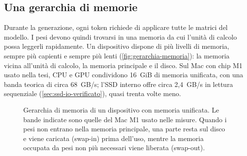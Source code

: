 \subsection{Una gerarchia di memorie}

Durante la generazione, ogni token richiede di applicare tutte le matrici del modello. I pesi devono quindi trovarsi in una memoria da cui l'unità di calcolo possa leggerli rapidamente. Un dispositivo dispone di più livelli di memoria, sempre più capienti e sempre più lenti (\autoref{fig:gerarchia-memoria}): la memoria vicina all'unità di calcolo, la memoria principale e il disco. Sul Mac con chip M1 usato nella tesi, CPU e GPU condividono 16~GiB di memoria unificata, con una banda teorica di circa 68~GB/s; l'SSD interno offre circa 2,4~GB/s in lettura sequenziale (\autoref{sec:ssd-io-verificato}), quasi trenta volte meno.

\begin{figure}[htbp]
\centering
{}
\caption{Gerarchia di memoria di un dispositivo con memoria unificata. Le bande indicate sono quelle del Mac M1 usato nelle misure. Quando i pesi non entrano nella memoria principale, una parte resta sul disco e viene caricata (swap-in) prima dell'uso, mentre la memoria occupata da pesi non più necessari viene liberata (swap-out).}
\label{fig:gerarchia-memoria}
\end{figure}

